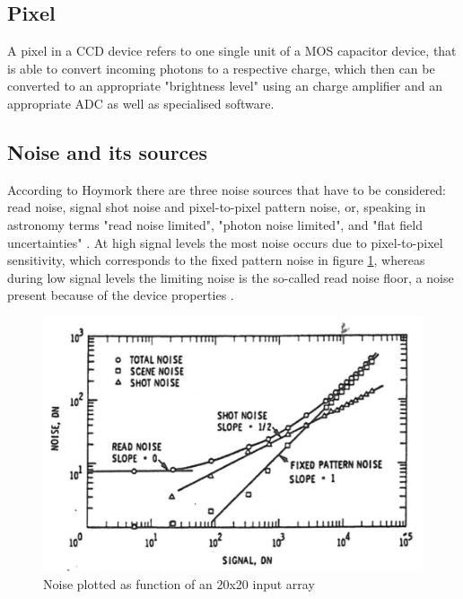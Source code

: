 
\subsection{Pixel}
A pixel in a CCD device refers to one single unit of a MOS capacitor device, that is able to convert incoming photons to a respective charge, which then can be converted to an appropriate "brightness level" using an charge amplifier and an appropriate ADC as well as specialised software.

\subsection{Noise and its sources}
\label{chap:noise}
According to Hoymork there are three noise sources that have to be considered: read noise, signal shot noise and pixel-to-pixel pattern noise, or, speaking in astronomy terms "read noise limited", "photon noise limited", and "flat field uncertainties" \citep{howellCCD,hoymorksensors}.
At high signal levels the most noise occurs due to pixel-to-pixel sensitivity, which corresponds to the fixed pattern noise in figure \ref{fig:noise}, whereas during low signal levels the limiting noise is the so-called read noise floor, a noise present because of the device properties \citep{hoymorksensors}.

\begin{figure}[!htbp]
	\centering
	\includegraphics[width=0.8\linewidth]{images/noise}
		\caption{Noise plotted as function of an 20x20 input array \citep[c.f.][fig. 6.24]{hoymorksensors} }
		 \label{fig:noise}
\end{figure}

